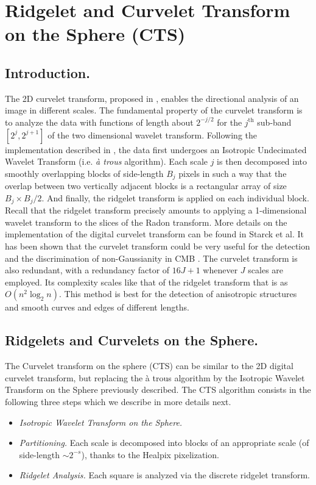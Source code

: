 \section{Ridgelet and Curvelet Transform on the Sphere (CTS) }
\label{sect_cur}
\subsection{Introduction.}

The 2D curvelet transform, proposed in \cite{cur:donoho99,starck:sta01_3,starck:sta02_3}, enables the directional analysis of an image 
in different scales. The fundamental property of the curvelet transform is to analyze the data with functions of length about $2^{-j/2}$ 
for the $j^{\textrm{th}}$ sub-band $[2^j, 2^{j+1}]$ of the two dimensional wavelet transform. Following the implementation described 
in \cite{starck:sta01_3,starck:sta02_3}, the data first undergoes an Isotropic Undecimated Wavelet Transform (i.e. \emph{\`a trous} algorithm). 
Each scale $j$ is then decomposed into smoothly overlapping blocks of side-length $B_j$ pixels in such a way that the overlap between two
vertically adjacent blocks is a rectangular array of size $B_j \times B_j/2$. And finally, the ridgelet transform \cite{cur:candes99_1} is 
applied on each individual block. Recall that the ridgelet transform precisely amounts to applying a 1-dimensional wavelet transform to the
slices of the Radon transform. More details on the implementation of the digital curvelet transform can be found in Starck et al\cite*{starck:sta01_3,starck:sta02_3}.
It has been shown that the curvelet transform could be very useful for the detection and the discrimination of non-Gaussianity in CMB \cite{starck:sta02_4}.
The curvelet transform is also redundant, with a redundancy factor of $16J+1$ whenever $J$ scales are employed. Its complexity scales like 
that of the ridgelet transform that is as $O(n^2 \log_2n)$. This method is best for the detection of anisotropic structures and smooth 
curves and edges of different lengths.

\subsection{Ridgelets and Curvelets on the Sphere.}
The Curvelet transform on the sphere (CTS) can be similar to the 2D digital curvelet transform, but replacing the \`a trous algorithm 
by the Isotropic Wavelet Transform on the Sphere previously described. The CTS algorithm consists in the following three steps which 
we describe in more details next.
\begin{itemize}
\item {\it Isotropic Wavelet Transform on the Sphere.}  
\item {\it Partitioning.} Each scale is decomposed into blocks of an appropriate scale (of side-length $\sim2^{-s}$), thanks to the Healpix pixelization.
\item {\it Ridgelet Analysis.} Each square is analyzed via the discrete ridgelet transform.
\end{itemize}

